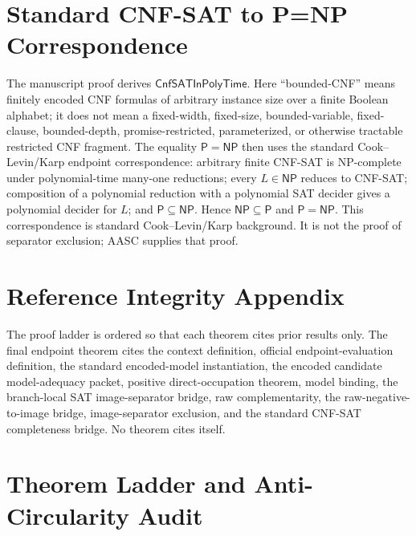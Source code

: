 \documentclass[11pt]{article}
\theoremstyle{definition}
\theoremstyle{remark}
\newcommand{\CnfSATP}{\mathsf{CnfSATInPolyTime}}
\newcommand{\Pclass}{\mathsf{P}}
\newcommand{\NPclass}{\mathsf{NP}}
\begin{document}
\section{Standard CNF-SAT to P=NP Correspondence}
The manuscript proof derives \(\CnfSATP\). Here ``bounded-CNF'' means finitely encoded CNF formulas of arbitrary instance size over a finite Boolean alphabet; it does not mean a fixed-width, fixed-size, bounded-variable, fixed-clause, bounded-depth, promise-restricted, parameterized, or otherwise tractable restricted CNF fragment. The equality \(\Pclass=\NPclass\) then uses the standard Cook--Levin/Karp endpoint correspondence: arbitrary finite CNF-SAT is NP-complete under polynomial-time many-one reductions; every \(L\in \NPclass\) reduces to CNF-SAT; composition of a polynomial reduction with a polynomial SAT decider gives a polynomial decider for \(L\); and \(\Pclass\subseteq\NPclass\). Hence \(\NPclass\subseteq\Pclass\) and \(\Pclass=\NPclass\). This correspondence is standard Cook--Levin/Karp background. It is not the proof of separator exclusion; AASC supplies that proof.

\section{Reference Integrity Appendix}
The proof ladder is ordered so that each theorem cites prior results only. The final endpoint theorem cites the context definition, official endpoint-evaluation definition, the standard encoded-model instantiation, the encoded candidate model-adequacy packet, positive direct-occupation theorem, model binding, the branch-local SAT image-separator bridge, raw complementarity, the raw-negative-to-image bridge, image-separator exclusion, and the standard CNF-SAT completeness bridge. No theorem cites itself.


\section{Theorem Ladder and Anti-Circularity Audit}
\end{document}
